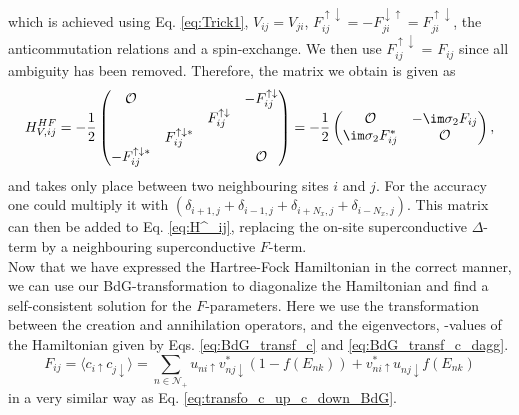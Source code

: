 \documentclass[../main.tex]{subfile}
\begin{document}
which is achieved using Eq. \ref{eq:Trick1}, $V_{ij} = {V_{ji}}$, $ F_{ij}^{\uparrow \downarrow} = -F_{ji}^{\downarrow \uparrow} = F_{ji}^{\uparrow \downarrow}$,
the anticommutation relations and a spin-exchange. We then use $F_{ij}^{\uparrow \downarrow}$ = $F_{ij}$ since all ambiguity has been removed.
Therefore, the matrix we obtain is given as
\begin{equation}\label{eq:H_V_DWave}
    H_{V,ij}^{HF} = -\frac{1}{2}\begin{pmatrix}
        \mathcal{O} & & & -F_{ij}^{\uparrow \downarrow}\\
         & & F_{ij}^{\uparrow \downarrow} & \\
         & F_{ij}^{\uparrow \downarrow\ast}& & \\
         -F_{ij}^{\uparrow \downarrow\ast} & & & \mathcal{O}\\
    \end{pmatrix} = -\frac{1}{2}\begin{pmatrix}
        \mathcal{O} & -\im \sigma_2 F_{ij}\\
        \im \sigma_2 F_{ij}^{\ast} & \mathcal{O}
    \end{pmatrix},
\end{equation}
and takes only place between two neighbouring sites $i$ and $j$. For the accuracy one could multiply it with 
$(\delta_{i+1,j} + \delta_{i-1,j} + \delta_{i+N_x,j} + \delta_{i-N_x,j})$. This matrix can then be added to Eq. \ref{eq:H^_ij}, replacing the on-site superconductive $\Delta$-term by
a neighbouring superconductive $F$-term.\\

Now that we have expressed the Hartree-Fock Hamiltonian in the correct manner, we can use our BdG-transformation to diagonalize the Hamiltonian and find a self-consistent solution 
for the $F$-parameters. Here we use the transformation between the creation and annihilation operators, and the eigenvectors, -values of the Hamiltonian given by Eqs. \ref{eq:BdG_transf_c} 
and \ref{eq:BdG_transf_c_dagg}. 
\begin{equation}
    F_{ij} = \langle c_{i\uparrow}c_{j\downarrow}\rangle = \sum_{n\in \mathcal{N}_+} u_{ni\uparrow}v_{nj\downarrow}^{\ast}\left(1 - f(E_{nk})\right) + v_{ni\uparrow}^{\ast}u_{nj\downarrow}f(E_{nk})
\end{equation}
in a very similar way as Eq. \ref{eq:transfo_c_up_c_down_BdG}.
\end{document}
